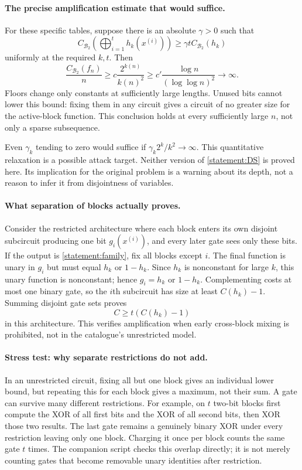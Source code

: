 \documentclass[11pt,a4paper]{article}
\numberwithin{equation}{section}
\begin{document}
\paragraph{The precise amplification estimate that would suffice.}
For these specific tables, suppose there is an absolute $\gamma>0$ such that
\begin{equation}\label{statement:DS}
 C_{\mathcal B_2}\left(\bigoplus_{i=1}^{t}h_k(x^{(i)})\right)
       \ge\gamma t C_{\mathcal B_2}(h_k)
\end{equation}
uniformly at the required $k,t$. Then
\[
 \frac{C_{\mathcal B_2}(f_n)}n
 \ge c\frac{2^{k(n)}}{k(n)^2}
 \ge c'\frac{\log n}{(\log\log n)^2}\longrightarrow\infty.
\]
Floors change only constants at sufficiently large lengths. Unused bits
cannot lower this bound: fixing them in any circuit gives a circuit of no
greater size for the active-block function. This conclusion holds at every
sufficiently large $n$, not only a sparse subsequence.

Even $\gamma_k$ tending to zero would suffice if
$\gamma_k2^k/k^2\to\infty$. This quantitative relaxation is a possible
attack target. Neither version of \eqref{statement:DS} is proved here. Its
implication for the original problem is a warning about its depth, not a
reason to infer it from disjointness of variables.

\paragraph{What separation of blocks actually proves.}
Consider the restricted architecture where each block enters its own disjoint
subcircuit producing one bit $g_i(x^{(i)})$, and every later gate sees only
these bits. If the output is \eqref{statement:family}, fix all blocks except $i$.
The final function is unary in $g_i$ but must equal $h_k$ or $1-h_k$.
Since $h_k$ is nonconstant for large $k$, this unary function is nonconstant;
hence $g_i=h_k$ or $1-h_k$. Complementing costs at most one binary gate, so
the $i$th subcircuit has size at least $C(h_k)-1$. Summing disjoint gate
sets proves
\[
 C\ge t(C(h_k)-1)
\]
in this architecture. This verifies amplification when early cross-block
mixing is prohibited, not in the catalogue's unrestricted model.

\paragraph{Stress test: why separate restrictions do not add.}
In an unrestricted circuit, fixing all but one block gives an individual
lower bound, but repeating this for each block gives a maximum, not their
sum. A gate can survive many different restrictions. For example, on $t$ two-bit blocks first compute the XOR of all first
bits and the XOR of all second bits, then XOR those two results. The last
gate remains a genuinely binary XOR under every restriction leaving only
one block. Charging it once per block counts the same gate $t$ times.
The companion script checks this overlap directly; it is not merely
counting gates that become removable unary identities after restriction.
\end{document}
